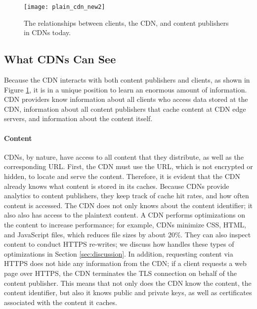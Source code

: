 \begin{figure}[t]
\centering
\texttt{[image: plain\_cdn\_new2]}
\caption{The relationships between clients, the CDN, and content publishers in 
CDNs today.}
\label{fig:basic_cdn}
\end{figure}

\subsection{What CDNs Can See}
\label{sec:info}
Because the CDN interacts with both content publishers and clients, as shown in Figure \ref{fig:basic_cdn}, it is in a unique position 
to learn an enormous amount of information.  CDN providers know information about all clients who
access data stored at the CDN, information about all content publishers that cache content at 
CDN edge servers, and information about the content itself.

\paragraph{Content}  CDNs, by nature, have access to all content that they distribute,
as well as 
the corresponding URL.  First, the CDN must use the URL, which is not 
encrypted or hidden, to locate and serve the content. Therefore, it is evident that
the CDN already knows what content is
stored in its caches.  Because CDNs provide analytics to content publishers, they
keep track of cache hit 
rates, and how often content is accessed.  The CDN does not only knows
about the content identifier; it also also 
has access to the plaintext content.  A CDN performs optimizations on the content
to increase performance; 
for example, CDNs minimize CSS, HTML, and JavaScript files, which reduces file sizes by about 20\%.  They can 
also inspect content to conduct HTTPS re-writes; we discuss how \system{} handles these types of optimizations  
in Section \ref{sec:discussion}. In addition, requesting content via HTTPS does not hide any information 
from the CDN; if a client requests a web page over HTTPS, the CDN terminates the TLS connection on behalf of the 
content publisher.  This means that not only does the CDN know the content, the
content identifier, but also it knows 
public and private keys, as well as certificates associated with the content it caches.  

